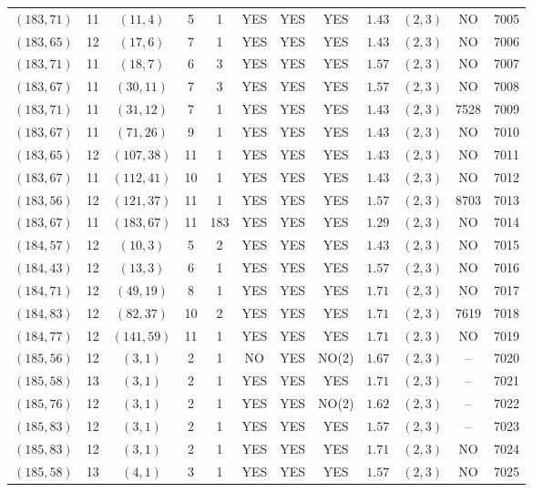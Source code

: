 \begin{longtable}{|c|c|c|c|c|c|c|c|c|c|c|c|}
$(183,71)$ & 11 & $(11,4)$ & 5 & 1 & YES & YES & YES & $1.43$ & $(2,3)$ & NO & 7005\\
$(183,65)$ & 12 & $(17,6)$ & 7 & 1 & YES & YES & YES & $1.43$ & $(2,3)$ & NO & 7006\\
$(183,71)$ & 11 & $(18,7)$ & 6 & 3 & YES & YES & YES & $1.57$ & $(2,3)$ & NO & 7007\\
$(183,67)$ & 11 & $(30,11)$ & 7 & 3 & YES & YES & YES & $1.57$ & $(2,3)$ & NO & 7008\\
$(183,71)$ & 11 & $(31,12)$ & 7 & 1 & YES & YES & YES & $1.43$ & $(2,3)$ & 7528 & 7009\\
$(183,67)$ & 11 & $(71,26)$ & 9 & 1 & YES & YES & YES & $1.43$ & $(2,3)$ & NO & 7010\\
$(183,65)$ & 12 & $(107,38)$ & 11 & 1 & YES & YES & YES & $1.43$ & $(2,3)$ & NO & 7011\\
$(183,67)$ & 11 & $(112,41)$ & 10 & 1 & YES & YES & YES & $1.43$ & $(2,3)$ & NO & 7012\\
$(183,56)$ & 12 & $(121,37)$ & 11 & 1 & YES & YES & YES & $1.57$ & $(2,3)$ & 8703 & 7013\\
$(183,67)$ & 11 & $(183,67)$ & 11 & 183 & YES & YES & YES & $1.29$ & $(2,3)$ & NO & 7014\\
$(184,57)$ & 12 & $(10,3)$ & 5 & 2 & YES & YES & YES & $1.43$ & $(2,3)$ & NO & 7015\\
$(184,43)$ & 12 & $(13,3)$ & 6 & 1 & YES & YES & YES & $1.57$ & $(2,3)$ & NO & 7016\\
$(184,71)$ & 12 & $(49,19)$ & 8 & 1 & YES & YES & YES & $1.71$ & $(2,3)$ & NO & 7017\\
$(184,83)$ & 12 & $(82,37)$ & 10 & 2 & YES & YES & YES & $1.71$ & $(2,3)$ & 7619 & 7018\\
$(184,77)$ & 12 & $(141,59)$ & 11 & 1 & YES & YES & YES & $1.71$ & $(2,3)$ & NO & 7019\\
$(185,56)$ & 12 & $(3,1)$ & 2 & 1 & NO & YES & NO(2) & $1.67$ & $(2,3)$ & -- & 7020\\
$(185,58)$ & 13 & $(3,1)$ & 2 & 1 & YES & YES & YES & $1.71$ & $(2,3)$ & -- & 7021\\
$(185,76)$ & 12 & $(3,1)$ & 2 & 1 & YES & YES & NO(2) & $1.62$ & $(2,3)$ & -- & 7022\\
$(185,83)$ & 12 & $(3,1)$ & 2 & 1 & YES & YES & YES & $1.57$ & $(2,3)$ & -- & 7023\\
$(185,83)$ & 12 & $(3,1)$ & 2 & 1 & YES & YES & YES & $1.71$ & $(2,3)$ & NO & 7024\\
$(185,58)$ & 13 & $(4,1)$ & 3 & 1 & YES & YES & YES & $1.57$ & $(2,3)$ & NO & 7025\\

\end{longtable}
